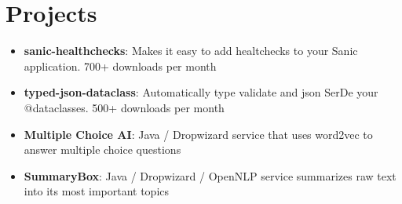 \documentclass[letterpaper,11pt]{article}
\newcommand{\resumeItem}[2]{
  \item\small{
    \textbf{#1}{: #2 \vspace{-2pt}}
  }
}
\newcommand{\resumeSubItem}[2]{\resumeItem{#1}{#2}\vspace{-4pt}}
\newcommand{\resumeSubHeadingListStart}{\begin{itemize}[leftmargin=*]}
\newcommand{\resumeSubHeadingListEnd}{\end{itemize}}
\begin{document}
\section{Projects}
  \resumeSubHeadingListStart
  \resumeSubItem{sanic-healthchecks}
    {Makes it easy to add healtchecks to your Sanic application. 700+ downloads per
    month}
  \resumeSubItem{typed-json-dataclass}
    {Automatically type validate and json SerDe your @dataclasses. 500+ downloads per
    month}
  \resumeSubItem{Multiple Choice AI}
    {Java / Dropwizard service that uses word2vec to answer
    multiple choice questions}
  \resumeSubItem{SummaryBox}
    {Java / Dropwizard / OpenNLP service summarizes raw text into its most
    important topics}
  \resumeSubHeadingListEnd
\end{document}
